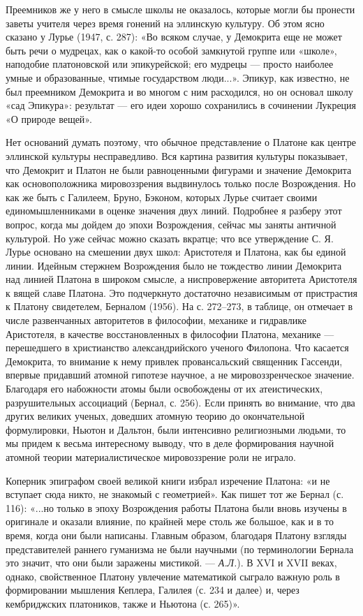 Преемников же  у него в  смысле школы  не оказалось, которые  могли бы
пронести заветы учителя через время  гонений на эллинскую культуру. Об
этом  ясно  сказано  у  Лурье  (1947,  с.  287):  «Во  всяком  случае,
у  Демокрита  еще не  может  быть  речи  о  мудрецах, как  о  какой-то
особой  замкнутой  группе  или  «школе»,  наподобие  платоновской  или
эпикурейской; его  мудрецы ---  просто наиболее умные  и образованные,
чтимые государством люди...». Эпикур,  как известно, не был преемником
Демокрита  и во  многом с  ним расходился,  но он  основал школу  «сад
Эпикура»:  результат  ---  его  идеи хорошо  сохранились  в  сочинении
Лукреция «О природе вещей».

Нет оснований думать поэтому, что  обычное представление о Платоне как
центре эллинской культуры несправедливо. Вся картина развития культуры
показывает,  что  Демокрит  и  Платон не  были  равноценными  фигурами
и  значение Демокрита  как  основоположника мировоззрения  выдвинулось
только после Возрождения.  Но как же быть с  Галилеем, Бруно, Бэконом,
которых Лурье считает своими  единомышленниками в оценке значения двух
линий.  Подробнее я  разберу этот  вопрос,  когда мы  дойдем до  эпохи
Возрождения, сейчас мы заняты античной  культурой. Но уже сейчас можно
сказать вкратце; что все утверждение  С. Я. Лурье основано на смешении
двух школ: Аристотеля и Платона, как бы единой линии. Идейным стержнем
Возрождения было  не тождество  линии Демокрита  над линией  Платона в
широком смысле,  а ниспровержение авторитета Аристотеля  к вящей славе
Платона.  Это  подчеркнуто  достаточно независимым  от  пристрастия  к
Платону свидетелем,  Берналом (1956).  На с.  272--273, в  таблице, он
отмечает  в  числе  развенчанных  авторитетов  в  философии,  механике
и  гидравлике  Аристотеля,  в  качестве  восстановленных  в  философии
Платона,  механике  ---  перешедшего в  христианство  александрийского
ученого Филопона. Что  касается Демокрита, то внимание  к нему привлек
провансальский священник Гассенди,  впервые придавший атомной гипотезе
научное,  а не  мировоззренческое значение.  Благодаря его  набожности
атомы были освобождены от  их атеистических, разрушительных ассоциаций
(Бернал, с.  256). Если  принять во внимание,  что два  других великих
ученых, доведших атомную теорию  до окончательной формулировки, Ньютон
и Дальтон, были интенсивно религиозными  людьми, то мы придем к весьма
интересному  выводу, что  в деле  формирования научной  атомной теории
материалистическое мировоззрение роли не играло.

Коперник эпиграфом своей великой книги избрал изречение Платона: «и не
вступает  сюда никто,  не знакомый  с  геометрией». Как  пишет тот  же
Бернал (с. 116): «...но только в эпоху Возрождения работы Платона были
вновь изучены в оригинале и оказали  влияние, по крайней мере столь же
большое, как и  в то время, когда они были  написаны. Главным образом,
благодаря  Платону взгляды  представителей раннего  гуманизма не  были
научными (по  терминологии Бернала это  значит, что они  были заражены
мистикой. --- \emph{А.Л.}).  В XVI и XVII  веках, однако, свойственное
Платону  увлечение  математикой  сыграло важную  роль  в  формировании
мышления  Кеплера, Галилея  (с.  234 и  далее)  и, через  кембриджских
платоников, также и Ньютона (с. 265)».

